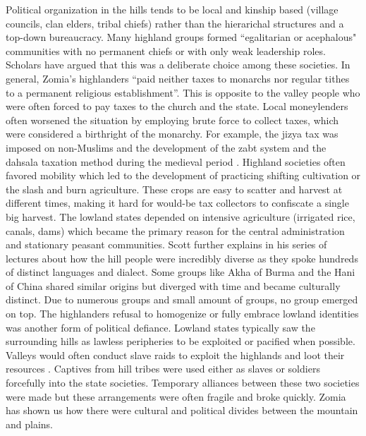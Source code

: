 Political organization in the hills tends to be local and kinship based (village councils, clan elders, tribal chiefs) rather than the hierarichal structures and a top-down bureaucracy. Many highland groups formed ``egalitarian or acephalous" communities with no permanent chiefs or with only weak leadership roles. Scholars have argued that this was a deliberate choice among these societies. In general, Zomia’s highlanders ``paid neither taxes to monarchs nor regular tithes to a permanent religious establishment”. This is opposite to the valley people who were often forced to pay taxes to the church and the state. Local moneylenders often worsened the situation by employing brute force to collect taxes, which were considered a birthright of the monarchy. For example, the jizya tax was imposed on non-Muslims and the development of the zabt system and the dahsala taxation method during the medieval period \citep{moosvi1973production}. Highland societies often favored mobility which led to the development of practicing shifting cultivation or the slash and burn agriculture. These crops are easy to scatter and harvest at different times, making it hard for would-be tax collectors to confiscate a single big harvest. The lowland states depended on intensive agriculture (irrigated rice, canals, dams) which became the primary reason for the central administration and stationary peasant communities. Scott further explains in his series of lectures  \citep{scott2005civilizations} about how the hill people were incredibly diverse as they spoke hundreds of distinct languages and dialect. Some groups like Akha of Burma and the Hani of China shared similar origins \citep{boonyasaranai2014common} but diverged with time and became culturally distinct. Due to numerous groups and small amount of groups, no group emerged on top. The highlanders refusal to homogenize or fully embrace lowland identities was another form of political defiance. Lowland states typically saw the surrounding hills as lawless peripheries to be exploited or pacified when possible. Valleys would often conduct slave raids to exploit the highlands and loot their resources \citep{walker1999legend}. Captives from hill tribes were used either as slaves or soldiers forcefully into the state societies. Temporary alliances between these two societies were made  but these arrangements were often fragile and broke quickly. Zomia has shown us how there were cultural and political divides between the mountain and plains.

